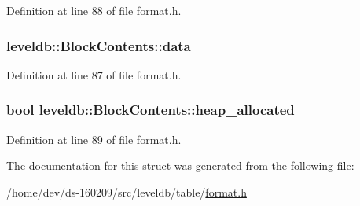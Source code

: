Definition at line 88 of file format.\+h.

\hypertarget{structleveldb_1_1_block_contents_aa30fe6388fe0f89d5565f6bae788c28e}{}
\subsubsection[{data}]{ leveldb\+::\+Block\+Contents\+::data}\label{structleveldb_1_1_block_contents_aa30fe6388fe0f89d5565f6bae788c28e}


Definition at line 87 of file format.\+h.

\hypertarget{structleveldb_1_1_block_contents_a0d4390fa3d4041ac5a3da51cbb16e315}{}
\subsubsection[{heap\+\_\+allocated}]{\setlength{\rightskip}{0pt plus 5cm}bool leveldb\+::\+Block\+Contents\+::heap\+\_\+allocated}\label{structleveldb_1_1_block_contents_a0d4390fa3d4041ac5a3da51cbb16e315}


Definition at line 89 of file format.\+h.



The documentation for this struct was generated from the following file\+:\begin{DoxyCompactItemize}
\item 
/home/dev/ds-\/160209/src/leveldb/table/\hyperlink{format_8h}{format.\+h}\end{DoxyCompactItemize}

